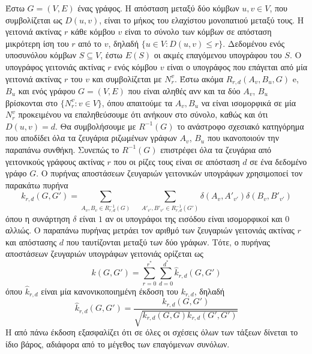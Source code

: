 Έστω $G=(V,E)$ ένας γράφος.
Η απόσταση μεταξύ δύο κόμβων $u,v \in V$, που συμβολίζεται ως $D(u,v)$, είναι το μήκος του ελαχίστου μονοπατιού μεταξύ τους.
Η γειτονιά ακτίνας $r$ κάθε κόμβου $v$ είναι το σύνολο των κόμβων σε απόσταση μικρότερη ίση του $r$ από το $v$, δηλαδή $\{ u \in V : D(u,v) \leq r\}$.
Δεδομένου ενός υποσυνόλου κόμβων $S \subseteq V$, έστω $E(S)$ οι ακμές επαγόμενου υπογράφου του $S$.
Ο υπογράφος γειτονιάς ακτίνας $r$ ενός κόμβου $v$ είναι ο υπογράφος που επάγεται από μία γειτονιά ακτίνας $r$ του $v$ και συμβολίζεται με $N_r^v$.
Έστω ακόμα $R_{r,d}(A_v,B_u,G)$ e, $B_u$ και ενός γράφου $G=(V,E)$ που είναι αληθές ανν και τα δύο $A_v$, $B_u$ βρίσκονται στο $\{N_r^v : v \in V \}$, όπου απαιτούμε τα $A_v, B_u$ να είναι ισομορφικά σε μία $N_r^v$ προκειμένου να επαληθεύσουμε ότι ανήκουν στο σύνολο, καθώς και ότι $D(u,v) = d$.
Θα συμβολήσουμε με $R^{-1}(G)$ το ανάστροφο σχεσιακό κατηγόρημα που αποδίδει όλα τα ζευγάρια ριζωμένων γράφων $A_v$, $B_u$ που ικανοποιούν την παραπάνω συνθήκη.
Συνεπώς το $R^{-1}(G)$ επιστρέφει όλα τα ζευγάρια από γειτονικούς γράφους ακτίνας $r$ που οι ρίζες τους είναι σε απόσταση $d$ σε ένα δεδομένο γράφο $G$.
Ο πυρήνας αποστάσεων ζευγαριών γειτονικών υπογράφων χρησιμοποεί τον παρακάτω πυρήνα
\begin{equation*}
    k_{r,d}(G, G') = \sum_{A_v, B_v \in R_{r,d}^{-1}(G)} \quad \sum_{A'_{v'}, B'_{v'} \in R_{r,d}^{-1}(G')} \delta(A_v, A'_{v'}) \delta(B_v, B'_{v'})
\end{equation*}
όπου η συνάρτηση $\delta$ είναι $1$ αν οι υπογράφοι της εισόδου είναι ισομορφικοί και $0$ αλλιώς.
Ο παραπάνω πυρήνας μετράει τον αριθμό των ζευγαριών γειτονιάς ακτίνας $r$ και απόστασης $d$ που ταυτίζονται μεταξύ των δύο γράφων.
Τότε, ο πυρήνας αποστάσεων ζευγαριών υπογράφων γειτονιάς ορίζεται ως
\begin{equation*}
    k(G, G') = \sum_{r=0}^{r^*} \sum_{d=0}^{d^*} \hat{k}_{r,d}(G, G')
\end{equation*}
όπου $\hat{k}_{r,d}$ είναι μία κανονικοποιημένη έκδοση του  $k_{r,d}$, δηλαδή
\begin{equation*}
    \hat{k}_{r,d}(G,G') = \frac{k_{r,d}(G,G')}{\sqrt{k_{r,d}(G,G) k_{r,d}(G',G')}}
\end{equation*}
Η από πάνω έκδοση εξασφαλίζει ότι σε όλες οι σχέσεις όλων των τάξεων δίνεται το ίδιο βάρος, αδιάφορα από το μέγεθος των επαγόμενων συνόλων.

